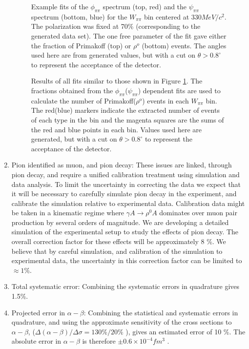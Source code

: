 \begin{enumerate}
\begin{figure}[th]
\centering
\caption{Example fits of the $\phi_{\pi\pi}$ spectrum (top, red) and the $\psi_{\pi\pi}$ spectrum (bottom, blue) for the $W_{\pi\pi}$ bin centered at $330 MeV/c^2$. The polarization was fixed at 70\% (corresponding to the generated data set). The one free parameter of the fit gave either the fraction of Primakoff (top) or $\rho^{o}$ (bottom) events. The angles used here are from generated values, but with a cut on $\theta>0.8^{\circ}$ to represent the acceptance of the detector.}
\label{sample_phi_psi_fit}
\end{figure}

\begin{figure}[tp]
\centering
\caption{Results of all fits similar to those shown in Figure \ref{sample_phi_psi_fit}. The fractions obtained from the $\phi_{\pi\pi}$($\psi_{\pi\pi}$) dependent fits are used to calculate the number of Primakoff($\rho^{o}$) events in each $W_{\pi\pi}$ bin. The red(blue) markers indicate the extracted number of events of each type in the bin and the magenta squares are the sums of the red and blue points in each bin. Values used here are generated, but with a cut on $\theta>0.8^{\circ}$ to represent the acceptance of the detector. }
\label{Wpipi_fit}
\end{figure}


\item
Pion identified as muon, and pion decay: These issues are linked, through pion decay, 
and require a unified calibration treatment using simulation and data analysis. 
To limit the uncertainty in correcting the data  we expect that it will be necessary
to carefully simulate pion decay in the experiment, and calibrate the simulation relative to experimental data. Calibration data might be taken in a kinematic regime where $\gamma A \rightarrow \rho^0 A$ dominates over muon pair production by several orders of magnitude. 
We are developing a detailed simulation of the experimental setup to study the effects of pion decay. 
The overall correction factor for these effects will be approximately 8 \%.  We believe that by careful simulation, and calibration of 
the simulation to experimental data, the uncertainty in this correction factor can be limited to $\approx 1 \% $.  


\item
Total systematic error: Combining the systematic errors in quadrature gives 1.5\%.

\item
Projected error in $\alpha - \beta$: Combining the statistical and systematic errors in quadrature,  and using the approximate sensitivity of the
cross sections to $\alpha - \beta$, ($\Delta(\alpha - \beta)/\Delta \sigma = 130\% /20\%$ ), gives an estimated error of 10 \%.  The absolute 
error in $\alpha -\beta$ is therefore $\pm 0.6 \times 10^{-4} fm^3$ . 

\end{enumerate}

